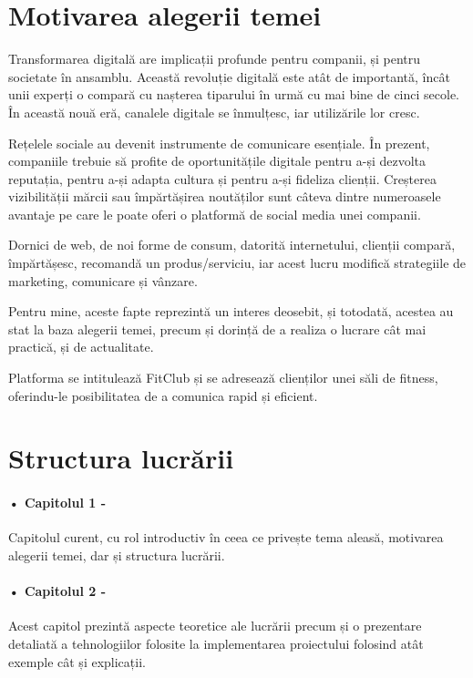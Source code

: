 \section{Motivarea alegerii temei}

Transformarea digitală are implicații profunde pentru companii, și pentru societate în ansamblu. Această revoluție digitală este atât de importantă, încât unii experți o compară cu nașterea tiparului în urmă cu mai bine de cinci secole. În această nouă eră, canalele digitale se înmulțesc, iar utilizările lor cresc.\newline
 
Rețelele sociale au devenit instrumente de comunicare esențiale. În prezent, companiile trebuie să profite de oportunitățile digitale pentru a-și dezvolta reputația, pentru a-și adapta cultura și pentru a-și fideliza clienții. Creșterea vizibilității mărcii sau împărtășirea noutăților sunt câteva dintre numeroasele avantaje pe care le poate oferi o platformă de social media unei companii.\newline
 
Dornici de web, de noi forme de consum, datorită internetului, clienții compară, împărtășesc, recomandă un produs/serviciu, iar acest lucru modifică strategiile de marketing, comunicare și vânzare.\newline

Pentru mine, aceste fapte reprezintă un interes deosebit, și totodată, acestea au stat la baza alegerii temei, precum și dorință de a realiza o lucrare cât mai practică, și de actualitate.\newline

Platforma se intitulează FitClub și se adresează clienților unei săli de fitness, oferindu-le posibilitatea de a comunica rapid și eficient.


\section{Structura lucrării}

\paragraph{•  Capitolul 1 -}Capitolul curent, cu rol introductiv în ceea ce privește tema aleasă, motivarea alegerii temei, dar și structura lucrării.

\paragraph{•  Capitolul 2 -}Acest capitol prezintă aspecte teoretice ale lucrării precum și o prezentare detaliată a tehnologiilor folosite la implementarea proiectului folosind  atât exemple cât și explicații.

